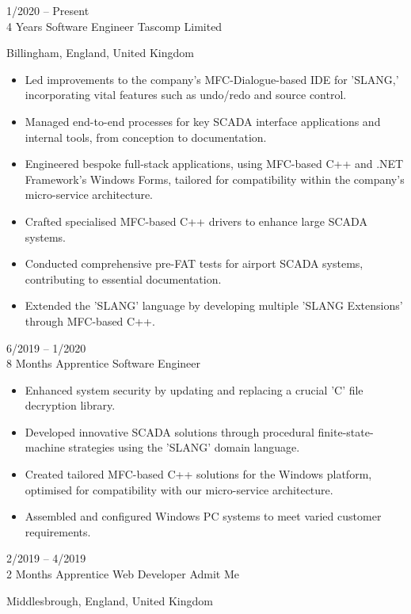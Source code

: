 \documentclass[9pt]{developercv} %
\begin{document}
\begin{entrylist}
	\entry
		{1/2020 -- Present\\4 Years}
		{Software Engineer}
		{Tascomp Limited}
		{Billingham, England, United Kingdom
		
		\begin{itemize}
		    \item[\ding{117}] Led improvements to the company's MFC-Dialogue-based IDE for 'SLANG,' incorporating vital features such as undo/redo and source control.
		    \item[\ding{117}] Managed end-to-end processes for key SCADA interface applications and internal tools, from conception to documentation.
		    \item[\ding{117}] Engineered bespoke full-stack applications, using MFC-based C++ and .NET Framework's Windows Forms, tailored for compatibility within the company’s micro-service architecture.
		    \item[\ding{117}] Crafted specialised MFC-based C++ drivers to enhance large SCADA systems.
		    \item[\ding{117}] Conducted comprehensive pre-FAT tests for airport SCADA systems, contributing to essential documentation.
		    \item[\ding{117}] Extended the 'SLANG' language by developing multiple 'SLANG Extensions' through MFC-based C++.
		\end{itemize}

		}
	\entry
		{6/2019 -- 1/2020\\8 Months}
		{Apprentice Software Engineer}
		{}
		{
		\begin{itemize}
		    \item[\ding{117}] Enhanced system security by updating and replacing a crucial 'C' file decryption library.
		    \item[\ding{117}] Developed innovative SCADA solutions through procedural finite-state-machine strategies using the 'SLANG' domain language.
		    \item[\ding{117}] Created tailored MFC-based C++ solutions for the Windows platform, optimised for compatibility with our micro-service architecture.
		    \item[\ding{117}] Assembled and configured Windows PC systems to meet varied customer requirements.
		\end{itemize}
		
		\vspace{1em}
		\hspace{2em}
		\vspace{1em}
		}
	\entry
		{2/2019 -- 4/2019\\2 Months}
		{Apprentice Web Developer}
		{Admit Me}
		{Middlesbrough, England, United Kingdom
		
}
\end{entrylist}
\end{document}

